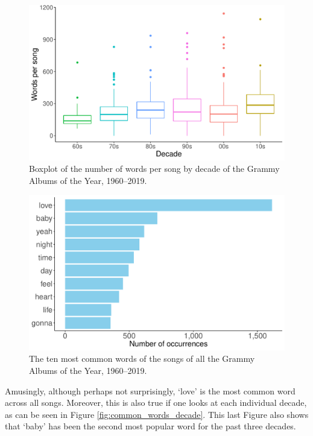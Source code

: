 \documentclass{article}
\begin{document}
\begin{figure}[h]
    \centering
    \includegraphics[scale=0.5]{Plots/Boxplot_WpS.pdf}
    \caption{Boxplot of the number of words per song by decade of the Grammy Albums of the Year, 1960--2019.}
    \label{fig:boxplot_WpS}
\end{figure}





\begin{figure}[h]
    \centering
    \includegraphics[scale=0.5]{Plots/graph_common_words.pdf}
    \caption{The ten most common words of the songs of all the Grammy Albums of the Year, 1960--2019.}
    \label{fig:common_words}
\end{figure}


Amusingly, although perhaps not surprisingly, `love' is the most common word across all songs. Moreover, this is also true if one looks at each individual decade, as can be seen in Figure \ref{fig:common_words_decade}. This last Figure also shows that `baby' has been the second most popular word for the past three decades.
\end{document}
